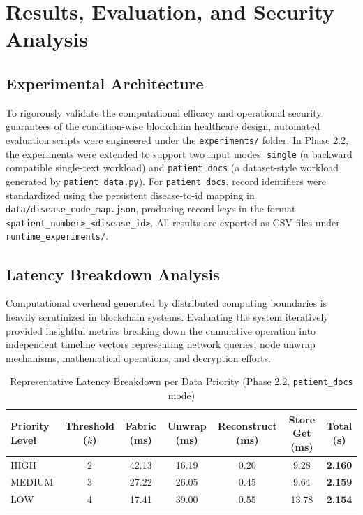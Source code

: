 \chapter{Results, Evaluation, and Security Analysis}

\section{Experimental Architecture}
To rigorously validate the computational efficacy and operational security guarantees of the condition-wise blockchain healthcare design, automated evaluation scripts were engineered under the \texttt{experiments/} folder. In Phase 2.2, the experiments were extended to support two input modes: \texttt{single} (a backward compatible single-text workload) and \texttt{patient\_docs} (a dataset-style workload generated by \texttt{patient\_data.py}). For \texttt{patient\_docs}, record identifiers were standardized using the persistent disease-to-id mapping in \texttt{data/disease\_code\_map.json}, producing record keys in the format \texttt{<patient\_number>\_<disease\_id>}. All results are exported as CSV files under \texttt{runtime\_experiments/}.

\section{Latency Breakdown Analysis}
Computational overhead generated by distributed computing boundaries is heavily scrutinized in blockchain systems. Evaluating the system iteratively provided insightful metrics breaking down the cumulative operation into independent timeline vectors representing network queries, node unwrap mechanisms, mathematical operations, and decryption efforts.

\begin{table}[ht]
\centering
\begin{tabular}{|l|c|c|c|c|c|c|}
\hline
\textbf{Priority Level} & \textbf{Threshold ($k$)} & \textbf{Fabric (ms)} & \textbf{Unwrap (ms)} & \textbf{Reconstruct (ms)} & \textbf{Store Get (ms)} & \textbf{Total (s)} \\
\hline
HIGH & 2 & 42.13 & 16.19 & 0.20 & 9.28 & \textbf{2.160} \\
MEDIUM & 3 & 27.22 & 26.05 & 0.45 & 9.64 & \textbf{2.159} \\
LOW & 4 & 17.41 & 39.00 & 0.55 & 13.78 & \textbf{2.154} \\
\hline
\end{tabular}
\caption{Representative Latency Breakdown per Data Priority (Phase 2.2, \texttt{patient\_docs} mode)}
\label{tab:latency}
\end{table}


